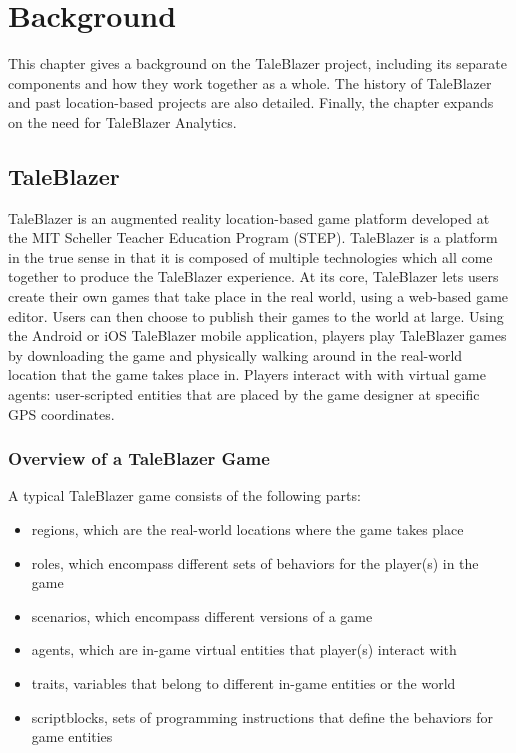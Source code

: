 \chapter{Background}

This chapter gives a background on the TaleBlazer project, including its separate components and how they work together as a whole. The history of TaleBlazer and past location-based projects are also detailed. Finally, the chapter expands on the need for TaleBlazer Analytics.

\section{TaleBlazer}

TaleBlazer is an augmented reality location-based game platform developed at the MIT Scheller Teacher Education Program (STEP). TaleBlazer is a platform in the true sense in that it is composed of multiple technologies which all come together to produce the TaleBlazer experience. At its core, TaleBlazer lets users create their own games that take place in the real world, using a web-based game editor. Users can then choose to publish their games to the world at large. Using the Android or iOS TaleBlazer mobile application, players play TaleBlazer games by downloading the game and physically walking around in the real-world location that the game takes place in. Players interact with with virtual game agents: user-scripted  entities that are placed by the game designer at specific GPS coordinates.

\subsection{Overview of a TaleBlazer Game}

A typical TaleBlazer game consists of the following parts: 
	\begin{itemize}
		\item regions, which are the real-world locations where the game takes place
		\item roles, which encompass different sets of behaviors for the player(s) in the game
		\item scenarios, which encompass different versions of a game
		\item agents, which are in-game virtual entities that player(s) interact with
		\item traits, variables that belong to different in-game entities or the world
		\item scriptblocks, sets of programming instructions that define the behaviors for game entities
	\end{itemize}

